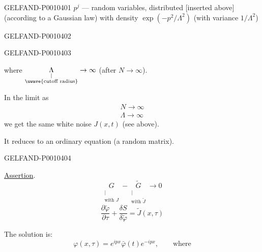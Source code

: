\begin{GelfandAdjacentEvidence}{GELFAND-P001040}{1}
$p^j$ --- random variables, distributed [inserted above] (according to a Gaussian law)
with density $\exp(-p^2/\Lambda^2)$ (with variance $1/\Lambda^2$)
\end{GelfandAdjacentEvidence}
\begin{GelfandAdjacentEvidence}{GELFAND-P001040}{2}

\end{GelfandAdjacentEvidence}
\begin{GelfandAdjacentEvidence}{GELFAND-P001040}{3}


where $\underset{\substack{\vert\\\text{\uwave{cutoff radius}}}}{\Lambda}\to\infty$
(after $N\to\infty$).

In the limit as
\[
\begin{gathered}
N\to\infty\\
\Lambda\to\infty
\end{gathered}
\]
we get the same white noise $J(x,t)$ (see above).

It reduces to an ordinary equation (a random matrix).

\end{GelfandAdjacentEvidence}
\begin{GelfandAdjacentEvidence}{GELFAND-P001040}{4}


\underline{Assertion}.
\[
\underset{\substack{\vert\\\text{with }J}}{G}
-\underset{\substack{\vert\\\text{with }\widetilde J}}{\widetilde G}
\to0
\]
\begin{equation*}
\frac{\partial\widetilde\varphi}{\partial\tau}
+\frac{\delta S}{\delta\widetilde\varphi}=\widetilde J(x,\tau)
\tag{14}
\end{equation*}

The solution is:
\begin{equation*}
\varphi(x,\tau)=e^{ipx}\bar\varphi(t)e^{-ipx},\qquad\text{where}
\tag{15}
\end{equation*}
\end{GelfandAdjacentEvidence}
